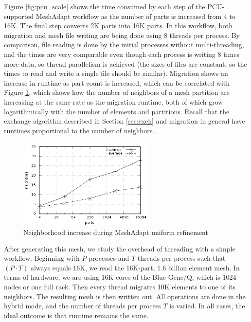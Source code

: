 Figure \ref{fig:pcu_scale} shows the time consumed by each step of the
PCU-supported MeshAdapt workflow as the number of parts is increased from 4 to
16K.
The final step converts 2K parts into 16K parts.
In this workflow, both migration and mesh file writing are being
done using 8 threads per process.
By comparison, file reading is done by the initial processes
without multi-threading,
and the times are very comparable even though each process
is writing 8 times more data, so thread parallelism is achieved
(the sizes of files are constant, so the times to read and write
a single file should be similar).
Migration shows an increase in runtime as part count is
increased, which can be correlated with Figure \ref{fig:neighbor}, which
shows how the number of neighbors of a mesh partition
are increasing at the same rate as the migration runtime,
both of which grow logarithmically with the number of elements and partitions.
Recall that the exchange algorithm described in Section \ref{sec:exch}
and migration in general have runtimes proportional to the number
of neighbors.

\begin{figure}[!ht]
\begin{center}
\includegraphics[width=0.6\textwidth]{pcu_neighbor.png}
\caption{Neighborhood increase during MeshAdapt uniform refinement}
\label{fig:neighbor}
\end{center}
\end{figure}

After generating this mesh, we study the overhead of threading with
a simple workflow.
Beginning with $P$ processes and $T$ threads per process
such that $(P\cdot T)$ always equals 16K, we read the 16K-part,
1.6 billion element mesh.
In terms of hardware, we are using 16K cores of the Blue Gene/Q,
which is 1024 nodes or one full rack.
Then every thread migrates 10K elements to one of its
neighbors.
The resulting mesh is then written out.
All operations are done in the hybrid mode, and the
number of threads per process $T$ is varied.
In all cases, the ideal outcome is that runtime
remains the same.

